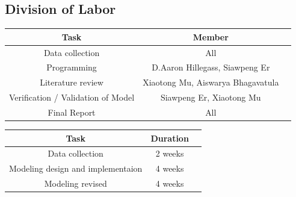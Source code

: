 \documentclass{article}
\begin{document}
\begin{normalsize}
    \section{Division of Labor}
       \begin{center}
    	\begin{tabular}{ |c|c|c| } 
    		\hline
    		Task & Member  \\ 
    		\hline
    		Data collection & All \\ 
    		Programming & D.Aaron Hillegass, Siawpeng Er \\ 
    		Literature review & Xiaotong Mu, Aiswarya Bhagavatula \\ 
    		Verification / Validation of Model & Siawpeng Er, Xiaotong Mu \\
    		Final Report & All\\
    		\hline
    	\end{tabular}
    \end{center}
       
    \begin{center}
    	\begin{tabular}{ |c|c|c| } 
    		\hline
    		Task & Duration  \\ 
    		\hline
    		Data collection & 2 weeks \\ 
    		Modeling design and implementaion & 4 weeks \\ 
    		Modeling revised & 4 weeks \\ 
    		\hline
    	\end{tabular}
    \end{center}
    
    
    
    
    
\end{normalsize}
  
\end{document}
